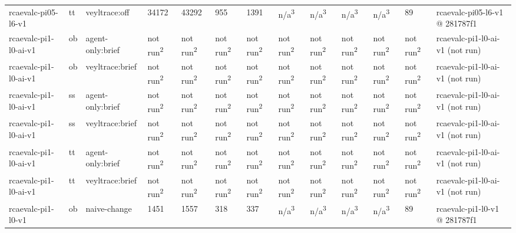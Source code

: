 \begin{table}[t]
\begin{tabular}{lllllllllllll}
rcaevalc-pi05-l6-v1 & tt & veyltrace:off & 34172 & 43292 & 955 & 1391 & n/a\textsuperscript{3} & n/a\textsuperscript{3} & n/a\textsuperscript{3} & n/a\textsuperscript{3} & 89 & rcaevalc-pi05-l6-v1 @ 281787f1 \\
rcaevalc-pi1-l0-ai-v1 & ob & agent-only:brief & not run\textsuperscript{2} & not run\textsuperscript{2} & not run\textsuperscript{2} & not run\textsuperscript{2} & not run\textsuperscript{2} & not run\textsuperscript{2} & not run\textsuperscript{2} & not run\textsuperscript{2} & not run\textsuperscript{2} & rcaevalc-pi1-l0-ai-v1 (not run) \\
rcaevalc-pi1-l0-ai-v1 & ob & veyltrace:brief & not run\textsuperscript{2} & not run\textsuperscript{2} & not run\textsuperscript{2} & not run\textsuperscript{2} & not run\textsuperscript{2} & not run\textsuperscript{2} & not run\textsuperscript{2} & not run\textsuperscript{2} & not run\textsuperscript{2} & rcaevalc-pi1-l0-ai-v1 (not run) \\
rcaevalc-pi1-l0-ai-v1 & ss & agent-only:brief & not run\textsuperscript{2} & not run\textsuperscript{2} & not run\textsuperscript{2} & not run\textsuperscript{2} & not run\textsuperscript{2} & not run\textsuperscript{2} & not run\textsuperscript{2} & not run\textsuperscript{2} & not run\textsuperscript{2} & rcaevalc-pi1-l0-ai-v1 (not run) \\
rcaevalc-pi1-l0-ai-v1 & ss & veyltrace:brief & not run\textsuperscript{2} & not run\textsuperscript{2} & not run\textsuperscript{2} & not run\textsuperscript{2} & not run\textsuperscript{2} & not run\textsuperscript{2} & not run\textsuperscript{2} & not run\textsuperscript{2} & not run\textsuperscript{2} & rcaevalc-pi1-l0-ai-v1 (not run) \\
rcaevalc-pi1-l0-ai-v1 & tt & agent-only:brief & not run\textsuperscript{2} & not run\textsuperscript{2} & not run\textsuperscript{2} & not run\textsuperscript{2} & not run\textsuperscript{2} & not run\textsuperscript{2} & not run\textsuperscript{2} & not run\textsuperscript{2} & not run\textsuperscript{2} & rcaevalc-pi1-l0-ai-v1 (not run) \\
rcaevalc-pi1-l0-ai-v1 & tt & veyltrace:brief & not run\textsuperscript{2} & not run\textsuperscript{2} & not run\textsuperscript{2} & not run\textsuperscript{2} & not run\textsuperscript{2} & not run\textsuperscript{2} & not run\textsuperscript{2} & not run\textsuperscript{2} & not run\textsuperscript{2} & rcaevalc-pi1-l0-ai-v1 (not run) \\
rcaevalc-pi1-l0-v1 & ob & naive-change & 1451 & 1557 & 318 & 337 & n/a\textsuperscript{3} & n/a\textsuperscript{3} & n/a\textsuperscript{3} & n/a\textsuperscript{3} & 89 & rcaevalc-pi1-l0-v1 @ 281787f1 \\

\end{tabular}
\end{table}
